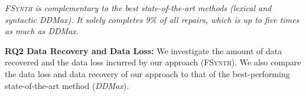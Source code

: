 \documentclass[sigconf,review,anonymous]{acmart}
\newenvironment{result}{\begin{framed}\centering\it}{\end{framed}}
\newcounter{todocounter}
\newcommand{\todo}[1]{\marginpar{$|$}\textcolor{red}{\stepcounter{todocounter}\footnote[\thetodocounter]{\textcolor{red}{\textbf{TODO }}\textit{#1}}}}
\renewcommand{\todo}[1]{}
\newcommand{\approach}{\textsc{FSynth}\xspace}
\newcommand{\ddmax}{\textit{DDMax}\xspace}
\begin{document}
\begin{result}
\approach %
is complementary to the best state-of-the-art methods (lexical and syntactic \ddmax). 
It %
solely completes 9\% of all repairs, which is 
up to five times 
as much as \ddmax.
\end{result}

\noindent
\textbf{RQ2 Data Recovery and Data Loss:} 
We investigate the amount of data recovered and the data loss incurred by our approach (\approach). 
We also compare the data loss and data recovery of our approach to that of the best-performing state-of-the-art method (\ddmax). 
\end{document}
